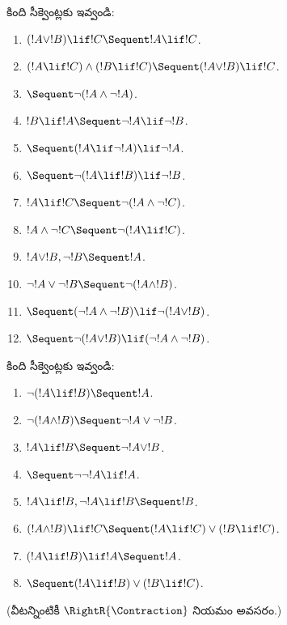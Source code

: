 \documentclass[../../../include/open-logic-section]{subfiles}
\begin{document}
\begin{prob}
కింది సీక్వెంట్లకు  ఇవ్వండి:
\begin{enumerate}
\item $(!A \lor !B) \lif !C \Sequent !A \lif !C$.
\item $(!A \lif !C) \land (!B \lif !C) \Sequent (!A \lor !B) \lif !C$.
\item $\Sequent \lnot(!A \land \lnot !A)$.
\item $!B \lif !A \Sequent \lnot !A \lif \lnot !B$.
\item $\Sequent (!A \lif \lnot !A) \lif \lnot !A$.
\item $\Sequent \lnot(!A \lif !B) \lif \lnot !B$.
\item $!A \lif !C \Sequent \lnot (!A \land \lnot !C)$.
\item $!A \land \lnot !C \Sequent \lnot (!A \lif !C)$.
\item $!A \lor !B, \lnot !B \Sequent !A$.
\item $\lnot !A \lor \lnot !B \Sequent \lnot(!A \land !B)$.
\item $\Sequent (\lnot !A \land \lnot !B) \lif\lnot(!A \lor !B)$.
\item $\Sequent \lnot(!A \lor !B) \lif (\lnot !A \land \lnot !B)$.
\end{enumerate}
\end{prob}

\begin{prob}
కింది సీక్వెంట్లకు  ఇవ్వండి:
\begin{enumerate}
\item $\lnot(!A \lif !B) \Sequent !A$.
\item $\lnot(!A \land !B) \Sequent \lnot !A \lor \lnot !B$.
\item $!A \lif !B \Sequent \lnot !A \lor !B$.
\item $\Sequent \lnot \lnot !A \lif !A$.
\item $!A \lif !B, \lnot !A \lif !B \Sequent !B$.
\item $(!A \land !B) \lif !C \Sequent (!A \lif !C) \lor (!B \lif !C)$.
\item $(!A \lif !B) \lif !A \Sequent !A$.
\item $\Sequent (!A \lif !B) \lor (!B \lif !C)$.
\end{enumerate}
(వీటన్నింటికీ $\RightR{\Contraction}$ నియమం అవసరం.)
\end{prob}
\end{document}
